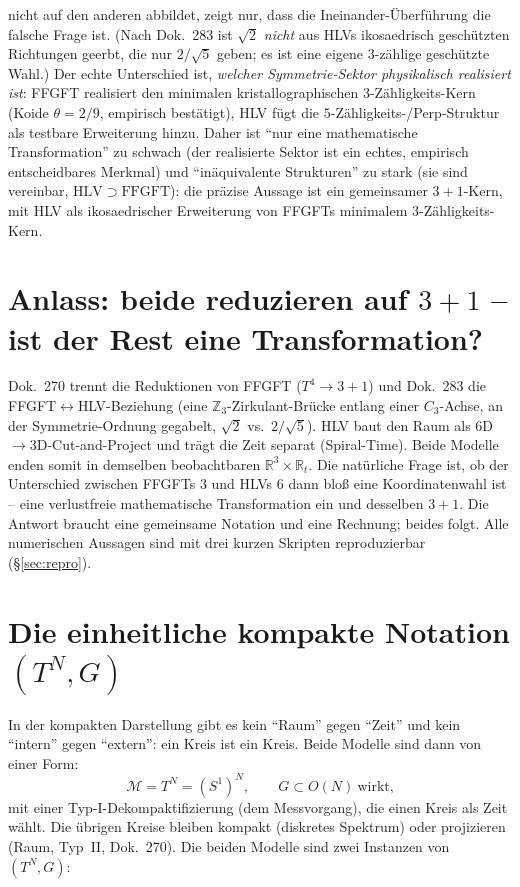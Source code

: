 nicht auf den anderen abbildet, zeigt nur, dass die Ineinander-Überführung die falsche
Frage ist. (Nach Dok.~283 ist $\sqrt2$ \emph{nicht} aus HLVs ikosaedrisch geschützten
Richtungen geerbt, die nur $2/\sqrt5$ geben; es ist eine eigene $3$-zählige geschützte
Wahl.) Der echte
Unterschied ist, \emph{welcher Symmetrie-Sektor physikalisch realisiert ist}: FFGFT
realisiert den minimalen kristallographischen $3$-Zähligkeits-Kern (Koide $\theta=2/9$,
empirisch bestätigt), HLV fügt die $5$-Zähligkeits-/Perp-Struktur als testbare Erweiterung
hinzu. Daher ist ``nur eine mathematische Transformation'' zu schwach (der realisierte
Sektor ist ein echtes, empirisch entscheidbares Merkmal) und ``inäquivalente Strukturen''
zu stark (sie sind vereinbar, $\mathrm{HLV}\supset\mathrm{FFGFT}$): die präzise Aussage ist
ein gemeinsamer $3{+}1$-Kern, mit HLV als ikosaedrischer Erweiterung von FFGFTs minimalem
$3$-Zähligkeits-Kern.

\section{Anlass: beide reduzieren auf $3{+}1$ -- ist der Rest eine Transformation?}
Dok.~270 trennt die Reduktionen von FFGFT ($T^4\to 3{+}1$) und Dok.~283 die
FFGFT$\leftrightarrow$HLV-Beziehung (eine $\mathbb{Z}_3$-Zirkulant-Brücke entlang einer
$C_3$-Achse, an der Symmetrie-Ordnung gegabelt, $\sqrt2$ vs.\ $2/\sqrt5$). HLV baut den
Raum als $6$D$\to3$D-Cut-and-Project und trägt die Zeit separat (Spiral-Time). Beide
Modelle enden somit in demselben beobachtbaren $\mathbb{R}^3\times\mathbb{R}_t$. Die
natürliche Frage ist, ob der Unterschied zwischen FFGFTs $3$ und HLVs $6$ dann bloß eine
Koordinatenwahl ist -- eine verlustfreie mathematische Transformation ein und desselben
$3{+}1$. Die Antwort braucht eine gemeinsame Notation und eine Rechnung; beides folgt. Alle
numerischen Aussagen sind mit drei kurzen Skripten reproduzierbar (\S\ref{sec:repro}).

\section{Die einheitliche kompakte Notation $(T^N, G)$}
In der kompakten Darstellung gibt es kein ``Raum'' gegen ``Zeit'' und kein ``intern''
gegen ``extern'': ein Kreis ist ein Kreis. Beide Modelle sind dann von einer Form:
\begin{equation}
\mathcal{M}=T^N=(S^1)^N,\qquad G\subset O(N)\ \text{wirkt,}
\end{equation}
mit einer Typ-I-Dekompaktifizierung (dem Messvorgang), die einen Kreis als Zeit wählt. Die
übrigen Kreise bleiben kompakt (diskretes Spektrum) oder projizieren (Raum, Typ~II,
Dok.~270). Die beiden Modelle sind zwei Instanzen von $(T^N,G)$:

